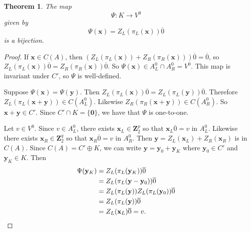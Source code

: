 \documentclass[12pt,twoside,singlespace]{article}
\numberwithin{equation}{section}
\newtheorem{thm}[equation]{Theorem}
\theoremstyle{definition}
\newcommand{\ZZ}{\mathbf{Z}}
\renewcommand{\vec}[1]{\mathbf{#1}}
\begin{document}
\begin{thm}
\label{thm:kv0}
The map
\[\Psi:K\to V^0\]
given by
\[\Psi(\vec{x})=Z_L(\pi_L(\vec{x}))\overline{0}\]
is a bijection.
\end{thm}
\begin{proof}
If $\vec{x}\in C(A)$, then $(Z_L(\pi_L(\vec{x}))+Z_R(\pi_R(\vec{x})))\overline{0}=\overline{0}$, so $Z_L(\pi_L(\vec{x}))\overline{0}=Z_R(\pi_R(\vec{x}))\overline{0}$.  So $\Psi(\vec{x})\in A_L^0\cap A_R^0=V^0$.  This map is invariant under $C'$, so $\Psi$ is well-defined.

Suppose $\Psi(\vec{x})=\Psi(\vec{y})$.  Then $Z_L(\pi_L(\vec{x}))\overline{0}=Z_L(\pi_L(\vec{y}))\overline{0}$.  Therefore $Z_L(\pi_L(\vec{x}+\vec{y}))\in C(A_L^0)$.  Likewise $Z_R(\pi_R(\vec{x}+\vec{y}))\in C(A_R^0)$.  So $\vec{x}+\vec{y}\in C'$.  Since $C'\cap K=\{\vec{0}\}$, we have that $\Psi$ is one-to-one.

Let $v\in V^0$.  Since $v\in A_L^0$, there exists $\vec{x}_L\in\ZZ_2^p$ so that $\vec{x}_L\overline{0}=v$ in $A_L^0$.  Likewise there exists $\vec{x}_R\in \ZZ_2^q$ so that $\vec{x}_R\overline{0}=v$ in $A_R^0$.  Then $\vec{y}=Z_L(\vec{x}_L)+Z_R(\vec{x}_R)$ is in $C(A)$.  Since $C(A)=C'\oplus K$, we can write $\vec{y}=\vec{y}_0+\vec{y}_K$ where $\vec{y}_0\in C'$ and $\vec{y}_K\in K$.  Then
\begin{align*}
\Psi(\vec{y}_K)&= Z_L(\pi_L(\vec{y}_K))\overline{0}\\
&= Z_L(\pi_L(\vec{y}-\vec{y}_0))\overline{0}\\
&= Z_L(\pi_L(\vec{y}))Z_L(\pi_L(\vec{y}_0))\overline{0}\\
&= Z_L(\pi_L(\vec{y}))\overline{0}\\
&= Z_L(\vec{x}_L)\overline{0} = v. \qedhere
\end{align*} 
\end{proof}
\end{document}
